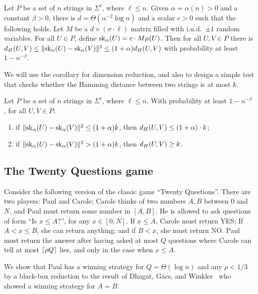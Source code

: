 \begin{corollary}\label{cor:dim_reduction}
Let $P$ be a set of $n$ strings in $\Sigma^{\ell}$, where $\ell \le n$. Given $\alpha = \alpha(n) > 0$ and a constant $\beta > 0$, there is $d = \Theta(\alpha^{-2}\log n)$ and a scalar $c > 0$ such that the following holds. Let $M$ be a $d \times (\sigma \cdot \ell)$ matrix filled with i.u.d.\ $\pm1$ random variables. For all $U \in P$, define $\mathrm{sk}_\alpha(U) = c\cdot M \mu(U)$. Then for all $U, V \in P$ there is $d_H(U,V) \leq \lVert\mathrm{sk}_\alpha(U) - \mathrm{sk}_\alpha(V)\rVert^2 \leq (1+\alpha) d_H(U, V)$ with probability at least $1- n^{-\beta}$.
\end{corollary}

We will use the corollary for dimension reduction, and also to design a simple test that checks whether the Hamming distance between two strings is at most $k$. 

\begin{corollary}
Let $P$ be a set of $n$ strings in $\Sigma^{\ell}$, where $\ell \le n$. With probability at least $1- n^{-\beta}$, for all $U, V \in P$:
\begin{enumerate}[label=\arabic*)]
\item if $\lVert\mathrm{sk}_\alpha(U)-\mathrm{sk}_\alpha(V)\rVert^2 \le (1+\alpha) k$, then $d_H(U, V) \le (1+\alpha) \cdot k$;
\item if $\lVert\mathrm{sk}_\alpha(U)-\mathrm{sk}_\alpha(V)\rVert^2 > (1+\alpha) k$, then $d_H(U, V) \ge k$.
\end{enumerate}
\end{corollary}

\subsection{The Twenty Questions game}
\label{sec:20questions}
Consider the following version of the classic game ``Twenty Questions''. There are two players: Paul and Carole; Carole thinks of two numbers $A, B$ between $0$ and $N$, and Paul must return some number in $[A,B]$. He is allowed to ask questions of form ``Is $x \le A$?'', for any $x \in [0,N]$. If $x \le A$, Carole must return YES; If $A < x \le B$, she can return anything; and if $B < x$, she must return NO. Paul must return the answer after having asked at most $Q$ questions where Carole can tell at most $\lceil \rho Q \rceil$ lies, and only in the case when $x \le A$.  

We show that Paul has a winning strategy for $Q = \Theta (\log n)$ and any $\rho < 1/3$ by a black-box reduction to the result of Dhagat, G{\'a}cs, and Winkler~\cite{Dhagat:1992:PLQ:139404.139409} who showed a winning strategy for $A = B$.

